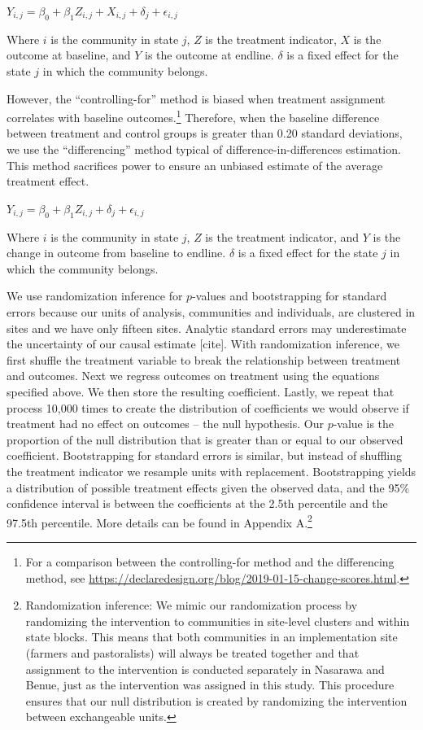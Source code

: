 \documentclass[11pt]{article}
\begin{document}
\(Y_{i,j} = \beta_0 + \beta_1Z_{i,j} + X_{i,j} + \delta_j + \epsilon_{i,j}\)

Where \(i\) is the community in state \(j\), \(Z\) is the treatment
indicator, \(X\) is the outcome at baseline, and \(Y\) is the outcome at
endline. \(\delta\) is a fixed effect for the state \(j\) in which the
community belongs.

However, the ``controlling-for'' method is biased when treatment
assignment correlates with baseline outcomes.\footnote{For a comparison
  between the controlling-for method and the differencing method, see
  \url{https://declaredesign.org/blog/2019-01-15-change-scores.html}.}
Therefore, when the baseline difference between treatment and control
groups is greater than 0.20 standard deviations, we use the
``differencing'' method typical of difference-in-differences estimation.
This method sacrifices power to ensure an unbiased estimate of the
average treatment effect.

\(Y_{i,j} = \beta_0 + \beta_1Z_{i,j} + \delta_j + \epsilon_{i,j}\)

Where \(i\) is the community in state \(j\), \(Z\) is the treatment
indicator, and \(Y\) is the change in outcome from baseline to endline.
\(\delta\) is a fixed effect for the state \(j\) in which the community
belongs.

We use randomization inference for \(p\)-values and bootstrapping for
standard errors because our units of analysis, communities and
individuals, are clustered in sites and we have only fifteen sites.
Analytic standard errors may underestimate the uncertainty of our causal
estimate {[}cite{]}. With randomization inference, we first shuffle the
treatment variable to break the relationship between treatment and
outcomes. Next we regress outcomes on treatment using the equations
specified above. We then store the resulting coefficient. Lastly, we
repeat that process 10,000 times to create the distribution of
coefficients we would observe if treatment had no effect on outcomes --
the null hypothesis. Our \(p\)-value is the proportion of the null
distribution that is greater than or equal to our observed coefficient.
Bootstrapping for standard errors is similar, but instead of shuffling
the treatment indicator we resample units with replacement.
Bootstrapping yields a distribution of possible treatment effects given
the observed data, and the 95\% confidence interval is between the
coefficients at the 2.5th percentile and the 97.5th percentile. More
details can be found in Appendix A.\footnote{Randomization inference: We
  mimic our randomization process by randomizing the intervention to
  communities in site-level clusters and within state blocks. This means
  that both communities in an implementation site (farmers and
  pastoralists) will always be treated together and that assignment to
  the intervention is conducted separately in Nasarawa and Benue, just
  as the intervention was assigned in this study. This procedure ensures
  that our null distribution is created by randomizing the intervention
  between exchangeable units.}
\end{document}
